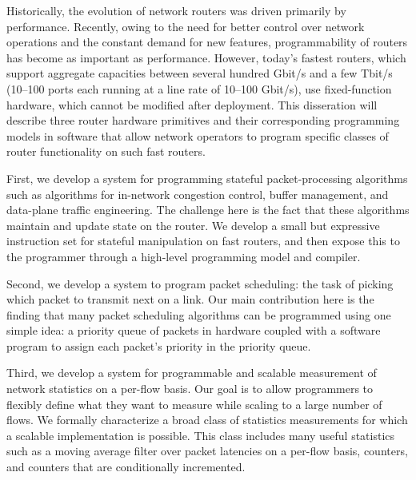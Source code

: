 % 
% 
%
Historically, the evolution of network routers was driven primarily by
performance. Recently, owing to the need for better control over network
operations and the constant demand for new features, programmability of routers
has become as important as performance.  However, today's fastest routers,
which support aggregate capacities between several hundred Gbit/s and a few
Tbit/s (10--100 ports each running at a line rate of 10--100 Gbit/s), use
fixed-function hardware, which cannot be modified after deployment. This
disseration will describe three router hardware primitives and their
corresponding programming models in software that allow network operators to
program specific classes of router functionality on such fast routers.

First, we develop a system for programming stateful packet-processing
algorithms such as algorithms for in-network congestion control, buffer
management, and data-plane traffic engineering. The challenge here is the fact
that these algorithms maintain and update state on the router.  We develop a
small but expressive instruction set for stateful manipulation on fast routers,
and then expose this to the programmer through a high-level programming model
and compiler.

Second, we develop a system to program packet scheduling: the task of picking
which packet to transmit next on a link. Our main contribution here is the
finding that many packet scheduling algorithms can be programmed using one
simple idea: a priority queue of packets in hardware coupled with a software
program to assign each packet's priority in the priority queue.

Third, we develop a system for programmable and scalable measurement of network
statistics on a per-flow basis. Our goal is to allow programmers to flexibly
define what they want to measure while scaling to a large number of flows. We
formally characterize a broad class of statistics measurements for which a
scalable implementation is possible. This class includes many useful statistics
such as a moving average filter over packet latencies on a per-flow basis,
counters, and counters that are conditionally incremented.

